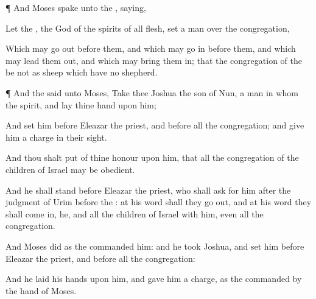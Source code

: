 {\par }{\PP {}¶ And
Moses
spake unto the
{},
saying,

Let the
{}, the
God of the
spirits of all
flesh,
set a
man over the
congregation,

Which may go
out
before them, and which may go
in
before them, and which may lead them
out, and which may bring them
in; that the
congregation of the
{} be not as
sheep which have no
shepherd.


\par }{\PP {}¶ And the
{}
said unto
Moses,
Take thee
Joshua the
son of
Nun, a
man in whom
{} the
spirit, and
lay thine
hand upon him;

And
set him
before
Eleazar the
priest, and
before all the
congregation; and give him a
charge in their
sight.

And thou shalt
put
{} of thine
honour upon him, that all the
congregation of the
children of
Israel may be
obedient.

And he shall
stand
before
Eleazar the
priest, who shall
ask
{} for him after the
judgment of
Urim
before the
{}: at his
word shall they go
out, and at his
word they shall come
in,
{} he, and all the
children of
Israel with him, even all the
congregation.

And
Moses
did as the
{}
commanded him: and he
took
Joshua, and
set him
before
Eleazar the
priest, and
before all the
congregation:

And he
laid his
hands upon him, and gave him a
charge, as the
{}
commanded by the
hand of
Moses.




\par }

